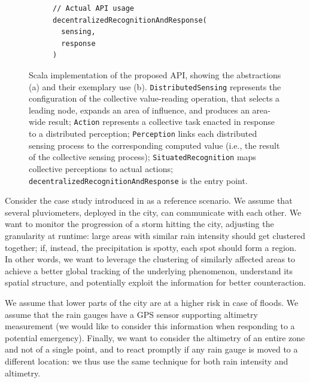 \begin{figure}
\begin{subfigure}[b]{0.49\linewidth}
\begin{lstlisting}[language=scafi]
// Actual API usage
decentralizedRecognitionAndResponse(
  sensing,
  response
)
\end{lstlisting}
\label{code:example}
\end{subfigure}
\caption[Scala implementation of the dynamic decentralization domains API]{
  Scala implementation of the proposed API,
  showing the abstractions (a)
  and their exemplary use (b).
  \texttt{DistributedSensing} represents the configuration of the collective value-reading operation,
  that selects a leading node, expands an area of influence, and produces an area-wide result;
  \texttt{Action} represents a collective task enacted in response to a distributed perception;
  \texttt{Perception} links each distributed sensing process to the corresponding computed value 
  (i.e., the result of the collective sensing process);
  \texttt{SituatedRecognition} maps collective perceptions to actual actions;
  \texttt{decentralizedRecognitionAndResponse} is the entry point.
}
\label{code}
\end{figure}

Consider the \casename{} case study introduced in  as a reference scenario.
%
We assume that several pluviometers, deployed in the city, can communicate with each other. 
%
We want to monitor the progression of a storm hitting the city,
adjusting the granularity at runtime:
large areas with similar rain intensity should get clustered together;
if, instead, the precipitation is spotty, each spot should form a region.
%
In other words,
we want to leverage the clustering of similarly affected areas to achieve a better global tracking of the underlying phenomenon,
understand its spatial structure,
and potentially exploit the information for better counteraction.

We assume that lower parts of the city are at a higher risk in case of floods.
%
We assume that the rain gauges have a GPS sensor supporting altimetry measurement
 (we would like to consider this information when responding to a potential emergency).
%
Finally,
we want to consider the altimetry of an entire zone and not of a single point,
and to react promptly if any rain gauge is moved to a different location:
we thus use the same technique for both rain intensity and altimetry.

